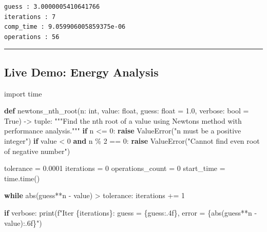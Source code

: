\documentclass[
  letterpaper,
  DIV=11,
  numbers=noendperiod]{scrartcl}
\newenvironment{Shaded}{\begin{snugshade}}{\end{snugshade}}
\newcommand{\BuiltInTok}[1]{\textcolor[rgb]{0.00,0.23,0.31}{#1}}
\newcommand{\CommentTok}[1]{\textcolor[rgb]{0.37,0.37,0.37}{#1}}
\newcommand{\ControlFlowTok}[1]{\textcolor[rgb]{0.00,0.23,0.31}{\textbf{#1}}}
\newcommand{\DecValTok}[1]{\textcolor[rgb]{0.68,0.00,0.00}{#1}}
\newcommand{\FloatTok}[1]{\textcolor[rgb]{0.68,0.00,0.00}{#1}}
\newcommand{\ImportTok}[1]{\textcolor[rgb]{0.00,0.46,0.62}{#1}}
\newcommand{\KeywordTok}[1]{\textcolor[rgb]{0.00,0.23,0.31}{\textbf{#1}}}
\newcommand{\NormalTok}[1]{\textcolor[rgb]{0.00,0.23,0.31}{#1}}
\newcommand{\OperatorTok}[1]{\textcolor[rgb]{0.37,0.37,0.37}{#1}}
\newcommand{\PreprocessorTok}[1]{\textcolor[rgb]{0.68,0.00,0.00}{#1}}
\newcommand{\SpecialCharTok}[1]{\textcolor[rgb]{0.37,0.37,0.37}{#1}}
\newcommand{\SpecialStringTok}[1]{\textcolor[rgb]{0.13,0.47,0.30}{#1}}
\newcommand{\StringTok}[1]{\textcolor[rgb]{0.13,0.47,0.30}{#1}}
\newcommand{\VariableTok}[1]{\textcolor[rgb]{0.07,0.07,0.07}{#1}}
\begin{document}
\begin{verbatim}
guess : 3.0000005410641766
iterations : 7
comp_time : 9.059906005859375e-06
operations : 56
\end{verbatim}

\begin{center}\rule{0.5\linewidth}{0.5pt}\end{center}

\subsection{Live Demo: Energy Analysis}\label{live-demo-energy-analysis}

\begin{Shaded}
\begin{Highlighting}[]
\ImportTok{import}\NormalTok{ time}

\KeywordTok{def}\NormalTok{ newtons\_nth\_root(n: }\BuiltInTok{int}\NormalTok{, value: }\BuiltInTok{float}\NormalTok{, guess: }\BuiltInTok{float} \OperatorTok{=} \FloatTok{1.0}\NormalTok{, verbose: }\BuiltInTok{bool} \OperatorTok{=} \VariableTok{True}\NormalTok{) }\OperatorTok{{-}\textgreater{}} \BuiltInTok{tuple}\NormalTok{:}
    \CommentTok{"""Find the nth root of a value using Newton\textquotesingle{}s method with performance analysis."""}
    \ControlFlowTok{if}\NormalTok{ n }\OperatorTok{\textless{}=} \DecValTok{0}\NormalTok{:}
        \ControlFlowTok{raise} \PreprocessorTok{ValueError}\NormalTok{(}\StringTok{"n must be a positive integer"}\NormalTok{)}
    \ControlFlowTok{if}\NormalTok{ value }\OperatorTok{\textless{}} \DecValTok{0} \KeywordTok{and}\NormalTok{ n }\OperatorTok{\%} \DecValTok{2} \OperatorTok{==} \DecValTok{0}\NormalTok{:}
        \ControlFlowTok{raise} \PreprocessorTok{ValueError}\NormalTok{(}\StringTok{"Cannot find even root of negative number"}\NormalTok{)}
    
\NormalTok{    tolerance }\OperatorTok{=} \FloatTok{0.0001}
\NormalTok{    iterations }\OperatorTok{=} \DecValTok{0}
\NormalTok{    operations\_count }\OperatorTok{=} \DecValTok{0}
\NormalTok{    start\_time }\OperatorTok{=}\NormalTok{ time.time()}
    
    \ControlFlowTok{while} \BuiltInTok{abs}\NormalTok{(guess}\OperatorTok{**}\NormalTok{n }\OperatorTok{{-}}\NormalTok{ value) }\OperatorTok{\textgreater{}}\NormalTok{ tolerance:}
\NormalTok{        iterations }\OperatorTok{+=} \DecValTok{1}
        
        \ControlFlowTok{if}\NormalTok{ verbose:}
            \BuiltInTok{print}\NormalTok{(}\SpecialStringTok{f"Iter }\SpecialCharTok{\{}\NormalTok{iterations}\SpecialCharTok{\}}\SpecialStringTok{: guess = }\SpecialCharTok{\{}\NormalTok{guess}\SpecialCharTok{:.4f\}}\SpecialStringTok{, error = }\SpecialCharTok{\{}\BuiltInTok{abs}\NormalTok{(guess}\OperatorTok{**}\NormalTok{n }\OperatorTok{{-}}\NormalTok{ value)}\SpecialCharTok{:.6f\}}\SpecialStringTok{"}\NormalTok{)}
        

\end{Highlighting}
\end{Shaded}
\end{document}
